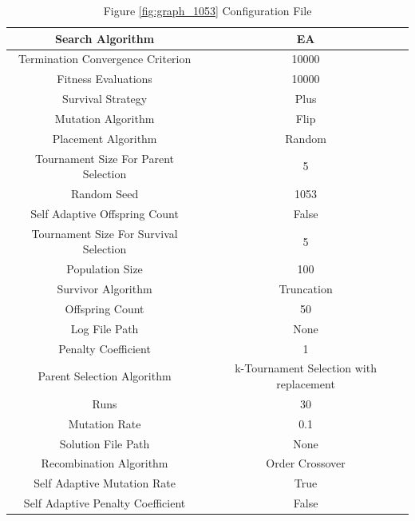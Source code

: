 \documentclass{standalone}
\begin{document}
\begin{table}[!htb]
	\centering
	\caption{Figure \ref{fig:graph_1053} Configuration File}
	\label{tab:graph_1053}
	\begin{tabular}{| c | c |}
		\hline
		Search Algorithm		& EA		 \\
		\hline
		Termination Convergence Criterion		& 10000		 \\
		\hline
		Fitness Evaluations		& 10000		 \\
		\hline
		Survival Strategy		& Plus		 \\
		\hline
		Mutation Algorithm		& Flip		 \\
		\hline
		Placement Algorithm		& Random		 \\
		\hline
		Tournament Size For Parent Selection		& 5		 \\
		\hline
		Random Seed		& 1053		 \\
		\hline
		Self Adaptive Offspring Count		& False		 \\
		\hline
		Tournament Size For Survival Selection		& 5		 \\
		\hline
		Population Size		& 100		 \\
		\hline
		Survivor Algorithm		& Truncation		 \\
		\hline
		Offspring Count		& 50		 \\
		\hline
		Log File Path		& None		 \\
		\hline
		Penalty Coefficient		& 1		 \\
		\hline
		Parent Selection Algorithm		& k-Tournament Selection with replacement		 \\
		\hline
		Runs		& 30		 \\
		\hline
		Mutation Rate		& 0.1		 \\
		\hline
		Solution File Path		& None		 \\
		\hline
		Recombination Algorithm		& Order Crossover		 \\
		\hline
		Self Adaptive Mutation Rate		& True		 \\
		\hline
		Self Adaptive Penalty Coefficient		& False		 \\
		\hline
	\end{tabular}
\end{table}
\end{document}
